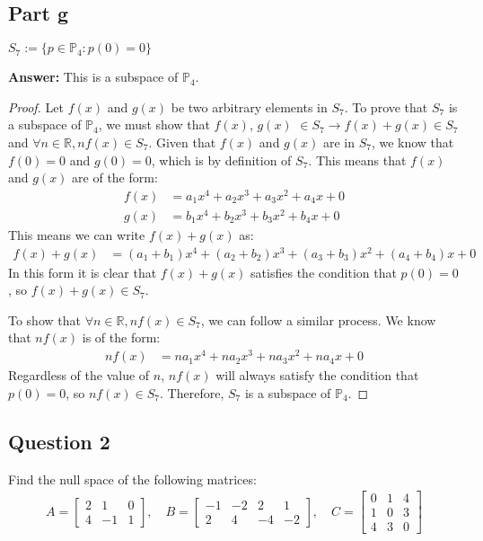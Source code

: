 \documentclass{article}
\begin{document}
\subsection*{Part g}
$S_{7} := \{p \in \mathbb{P}_{4} : p(0) = 0\}$

\textbf{Answer:} This is a subspace of $\mathbb{P}_{4}$.

\begin{proof}
Let $f(x)$ and $g(x)$ be two arbitrary elements in $S_{7}$.
To prove that $S_{7}$ is a subspace of $\mathbb{P}_{4}$, we must show that $f(x)$, $g(x)$ $\in S_{7} \rightarrow f(x) + g(x) \in S_{7}$ and $\forall n \in \mathbb{R}, nf(x) \in S_{7}$.
Given that $f(x)$ and $g(x)$ are in $S_{7}$, we know that $f(0) = 0$ and $g(0) = 0$, which is by definition of $S_{7}$.
This means that $f(x)$ and $g(x)$ are of the form:
\begin{align*} 
    f(x) &= a_{1}x^4 + a_{2}x^3 + a_{3}x^2 + a_{4}x + 0 \\ 
    g(x) &= b_{1}x^4 + b_{2}x^3 + b_{3}x^2 + b_{4}x + 0
\end{align*}
This means we can write $f(x) + g(x)$ as:
\begin{align*} 
    f(x) + g(x) &= (a_{1} + b_{1})x^4 + (a_{2} + b_{2})x^3 + (a_{3} + b_{3})x^2 + (a_{4} + b_{4})x + 0
\end{align*}
In this form it is clear that $f(x) +g(x)$ satisfies the condition that $p(0) = 0$, so $f(x) + g(x) \in S_{7}$.

To show that $\forall n \in \mathbb{R}, nf(x) \in S_{7}$, we can follow a similar process.
We know that $nf(x)$ is of the form:
\begin{align*} 
    nf(x) &= na_{1}x^4 + na_{2}x^3 + na_{3}x^2 + na_{4}x + 0
\end{align*}
Regardless of the value of $n$, $nf(x)$ will always satisfy the condition that $p(0) = 0$, so $nf(x) \in S_{7}$.
Therefore, $S_{7}$ is a subspace of $\mathbb{P}_{4}$.
\end{proof}

\newpage

\subsection*{Question 2}
Find the null space of the following matrices:
\begin{align*}
A = \begin{bmatrix} 2 & 1 & 0 \\ 4 & -1 & 1 \end{bmatrix}, \quad
B = \begin{bmatrix} -1 & -2 & 2 & 1 \\ 2 & 4 & -4 & -2 \end{bmatrix}, \quad
C = \begin{bmatrix} 0 & 1 & 4 \\ 1 & 0 & 3 \\ 4 & 3 & 0 \end{bmatrix}
\end{align*}
\end{document}
